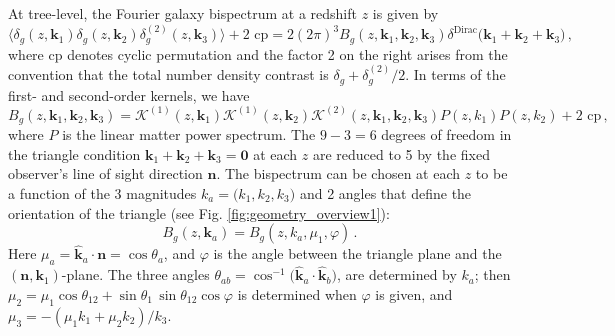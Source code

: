 At tree-level, the Fourier galaxy bispectrum at a redshift $z$ is given by
\begin{equation}
{\big\langle \delta_g(z,\bm{k}_{1})\delta_g(z,\bm{k}_{2})\delta^{(2)}_g(z,\bm{k}_{3}) \big\rangle + \text{2 cp}=2 (2\pi)^3 B_{g}(z, \bm{k}_{1}, \bm{k}_{2}, \bm{k}_{3}) \delta^{\mathrm{Dirac}}\big(\bm{k}_{1}+ \bm{k}_{2}+ \bm{k}_{3} \big)\,,}
\end{equation}
where cp denotes cyclic permutation and the factor 2 on the right arises from the convention that the total number density contrast is $\delta_g+ \delta^{(2)}_g/2$.  
In terms of the first- and second-order kernels, we have
\begin{equation}
B_{g}(z, \bm{k}_{1}, \bm{k}_{2}, \bm{k}_{3}) = \mathcal{K}^{(1)}(z, \bm{k}_{1})\mathcal{K}^{(1)}(z, \bm{k}_{2})\mathcal{K}^{(2)}(z, \bm{k}_{1}, \bm{k}_{2}, \bm{k}_{3})P(z, k_{1})P(z, k_{2}) + \text{2 cp}\,, \label{eq:bkern}
\end{equation}
where $P$ is the linear matter power spectrum. 
The $9-3=6$ degrees of freedom in the triangle condition $\bm{k}_{1}+ \bm{k}_{2}+ \bm{k}_{3}=\bm{0}$ at each $z$ are reduced to 5 by the fixed observer's line of sight direction $\bm{n}$.
The bispectrum can be chosen at each $z$ to be a function  of the 3 magnitudes ${k_a}=\big({k}_{1}, {k}_{2},{k}_{3}\big)$ and 2 angles that define the orientation of the triangle (see Fig. \ref{fig:geometry_overview1}):
\begin{equation}
B_{g}(z, \bm{k}_{a}) =B_{g}(z, {k}_{a},  \mu_1,\varphi) \,.
\end{equation}
Here $\mu_a=\hat{\bm{k}}_a\cdot\bm{n}=\cos\theta_a$,  and $\varphi$ is the angle between the triangle plane and the $(\bm{n},\bm{k}_1)$-plane. The three angles $\theta_{ab}= \cos^{-1}\big(\hat{\bm{k}}_{a} \cdot \hat{\bm{k}}_b\big)$, are determined by $k_a$; then $\mu_2=\mu_1\cos\theta_{12}+ \sin\theta_1\,\sin\theta_{12}\cos\varphi$ is determined when $\varphi$ is given, and $\mu_3=-(\mu_1k_1+\mu_2k_2)/k_3$.

